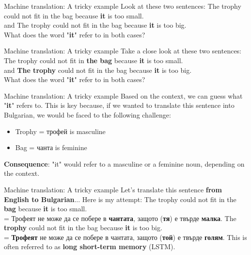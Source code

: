 \documentclass{beamer}
\begin{document}
\begin{frame}{Machine translation: A tricky example}
Look at these two sentences:
\pause
\vfill
The trophy could not fit in the bag because \textbf{it} is too small. \\
\vfill
and
\vfill
The trophy could not fit in the bag because \textbf{it} is too big. \\
\pause
\vfill
What does the word "\textbf{it}" refer to in both cases?
\end{frame}

\begin{frame}{Machine translation: A tricky example}
Take a close look at these two sentences:
\vfill
The trophy could not fit in {\color{blue}\textbf{the bag}} because {\color{blue}\textbf{it}} is too small. \\
\vfill
and
\vfill
{\color{red}\textbf{The trophy}} could not fit in the bag because {\color{red}\textbf{it}} is too big. \\
\vfill
What does the word "\textbf{it}" refer to in both cases?
\end{frame}

\begin{frame}{Machine translation: A tricky example}
Based on the context, we can guess what "\textbf{it}" refers to.
\vfill
\pause
This is key because, if we wanted to translate this sentence into Bulgarian, we would be faced to the following challenge:
\begin{itemize}
	\item {\color{red}Trophy = трофей} is {\color{red}masculine}
	\item {\color{blue}Bag = чанта} is {\color{blue}feminine}
\end{itemize}
\vfill
\pause
\textbf{Consequence}: "it" would refer to a masculine or a feminine noun, depending on the context.
\end{frame}

\begin{frame}{Machine translation: A tricky example}
Let's translate this sentence \textbf{from English to Bulgarian}... Here is my attempt:
\pause
\vfill
The trophy could not fit in the {\color{blue}\textbf{bag}} because {\color{blue}\textbf{it}} is too small. \\
= Трофеят не може да се побере в {\color{blue}\textbf{чантата}}, защото ({\color{blue}\textbf{тя}}) е твърде {\color{blue}\textbf{малка}}.
\pause
\vfill
The {\color{red}\textbf{trophy}} could not fit in the bag because {\color{red}\textbf{it}} is too big. \\
= {\color{red}\textbf{Трофеят}} не може да се побере в чантата, защото ({\color{red}\textbf{той}}) е твърде {\color{red}\textbf{голям}}.
\pause
\vfill
This is often referred to as \textbf{long short-term memory} (LSTM).
\end{frame}
\end{document}
